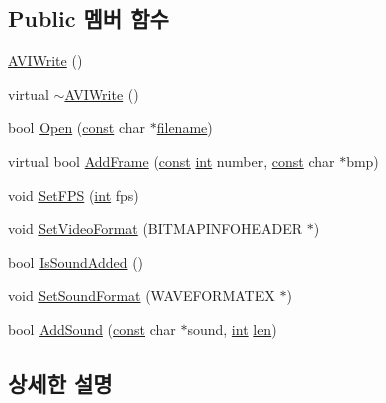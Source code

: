 \subsection*{Public 멤버 함수}
\begin{DoxyCompactItemize}
\item 
\mbox{\hyperlink{class_a_v_i_write_a057b52eb963ac47d2e6a5bc7970b2002}{A\+V\+I\+Write}} ()
\item 
virtual \mbox{\hyperlink{class_a_v_i_write_aa6fcfa34e54a6164554a9f1d43f666ad}{$\sim$\+A\+V\+I\+Write}} ()
\item 
bool \mbox{\hyperlink{class_a_v_i_write_a2b4ef2aeeef846bcb12ef58189043eb1}{Open}} (\mbox{\hyperlink{getopt1_8c_a2c212835823e3c54a8ab6d95c652660e}{const}} char $\ast$\mbox{\hyperlink{_test_emu_8cpp_ac33a174c39700095ca0f892624d85a3f}{filename}})
\item 
virtual bool \mbox{\hyperlink{class_a_v_i_write_a904b7f02ff6ecfeeaeec6e1c82f1592a}{Add\+Frame}} (\mbox{\hyperlink{getopt1_8c_a2c212835823e3c54a8ab6d95c652660e}{const}} \mbox{\hyperlink{_util_8cpp_a0ef32aa8672df19503a49fab2d0c8071}{int}} number, \mbox{\hyperlink{getopt1_8c_a2c212835823e3c54a8ab6d95c652660e}{const}} char $\ast$bmp)
\item 
void \mbox{\hyperlink{class_a_v_i_write_a3beb976b918287e0592ab4feebd9ce59}{Set\+F\+PS}} (\mbox{\hyperlink{_util_8cpp_a0ef32aa8672df19503a49fab2d0c8071}{int}} fps)
\item 
void \mbox{\hyperlink{class_a_v_i_write_a1da91adeefacf0dd4655f5029875c5d6}{Set\+Video\+Format}} (B\+I\+T\+M\+A\+P\+I\+N\+F\+O\+H\+E\+A\+D\+ER $\ast$)
\item 
bool \mbox{\hyperlink{class_a_v_i_write_a7e14c1640c3c888c2b0a0b042c0d5b8f}{Is\+Sound\+Added}} ()
\item 
void \mbox{\hyperlink{class_a_v_i_write_a8d864e6e2cea4147ffa6f24d69fbe339}{Set\+Sound\+Format}} (W\+A\+V\+E\+F\+O\+R\+M\+A\+T\+EX $\ast$)
\item 
bool \mbox{\hyperlink{class_a_v_i_write_a63b7d54c048e517bbfad0ae2004d9861}{Add\+Sound}} (\mbox{\hyperlink{getopt1_8c_a2c212835823e3c54a8ab6d95c652660e}{const}} char $\ast$sound, \mbox{\hyperlink{_util_8cpp_a0ef32aa8672df19503a49fab2d0c8071}{int}} \mbox{\hyperlink{expr-lex_8cpp_afed088663f8704004425cdae2120b9b3}{len}})
\end{DoxyCompactItemize}


\subsection{상세한 설명}


